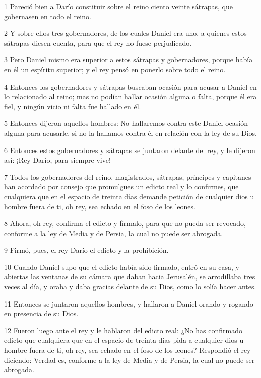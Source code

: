 \par 1 Pareció bien a Darío constituir sobre el reino ciento veinte sátrapas, que gobernasen en todo el reino.
\par 2 Y sobre ellos tres gobernadores, de los cuales Daniel era uno, a quienes estos sátrapas diesen cuenta, para que el rey no fuese perjudicado.
\par 3 Pero Daniel mismo era superior a estos sátrapas y gobernadores, porque había en él un espíritu superior; y el rey pensó en ponerlo sobre todo el reino.
\par 4 Entonces los gobernadores y sátrapas buscaban ocasión para acusar a Daniel en lo relacionado al reino; mas no podían hallar ocasión alguna o falta, porque él era fiel, y ningún vicio ni falta fue hallado en él.
\par 5 Entonces dijeron aquellos hombres: No hallaremos contra este Daniel ocasión alguna para acusarle, si no la hallamos contra él en relación con la ley de su Dios.
\par 6 Entonces estos gobernadores y sátrapas se juntaron delante del rey, y le dijeron así: ¡Rey Darío, para siempre vive!
\par 7 Todos los gobernadores del reino, magistrados, sátrapas, príncipes y capitanes han acordado por consejo que promulgues un edicto real y lo confirmes, que cualquiera que en el espacio de treinta días demande petición de cualquier dios u hombre fuera de ti, oh rey, sea echado en el foso de los leones.
\par 8 Ahora, oh rey, confirma el edicto y fírmalo, para que no pueda ser revocado, conforme a la ley de Media y de Persia, la cual no puede ser abrogada.
\par 9 Firmó, pues, el rey Darío el edicto y la prohibición.
\par 10 Cuando Daniel supo que el edicto había sido firmado, entró en su casa, y abiertas las ventanas de su cámara que daban hacia Jerusalén, se arrodillaba tres veces al día, y oraba y daba gracias delante de su Dios, como lo solía hacer antes.
\par 11 Entonces se juntaron aquellos hombres, y hallaron a Daniel orando y rogando en presencia de su Dios.
\par 12 Fueron luego ante el rey y le hablaron del edicto real: ¿No has confirmado edicto que cualquiera que en el espacio de treinta días pida a cualquier dios u hombre fuera de ti, oh rey, sea echado en el foso de los leones? Respondió el rey diciendo: Verdad es, conforme a la ley de Media y de Persia, la cual no puede ser abrogada.
